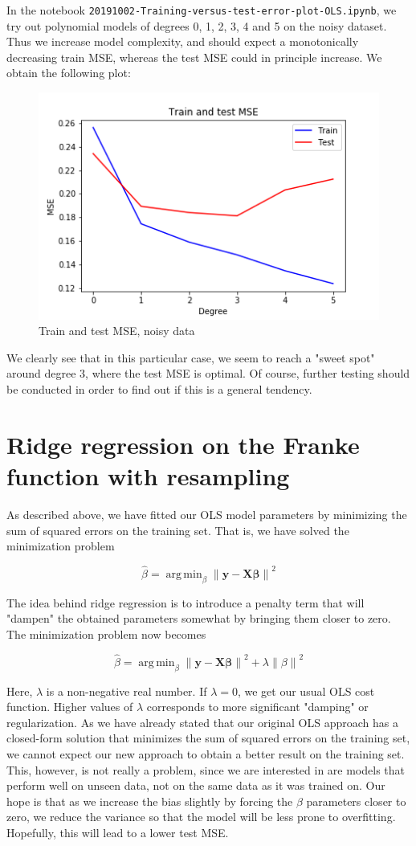 \documentclass{article}
\DeclareMathOperator*{\argminA}{arg\,min}
\begin{document}
In the notebook \texttt{20191002-Training-versus-test-error-plot-OLS.ipynb}, we try out polynomial models of degrees 0, 1, 2, 3, 4 and 5 on the noisy dataset. Thus we increase model complexity, and should expect a monotonically decreasing train MSE, whereas the test MSE could in principle increase. We obtain the following plot:

\begin{figure}[H]
    \includegraphics{figures/3_train_and_test_mse.png}
    \caption{Train and test MSE, noisy data}
    \label{}
\end{figure}

We clearly see that in this particular case, we seem to reach a "sweet spot" around degree 3, where the test MSE is optimal. Of course, further testing should be conducted in order to find out if this is a general tendency.

\section{Ridge regression on the Franke function with resampling}
As described above, we have fitted our OLS model parameters by minimizing the sum of squared errors on the training set. That is, we have solved the minimization problem

$$
\hat{\beta} = \argminA_{\beta} \left\|\mathbf{y - X\beta}\right\|^2
$$

The idea behind ridge regression is to introduce a penalty term that will "dampen" the obtained parameters somewhat by bringing them closer to zero. The minimization problem now becomes

$$
\hat{\beta} = \argminA_{\beta} \left\|\mathbf{y - X\beta}\right\|^2 + \lambda\left\|\beta\right\|^2
$$

Here, $\lambda$ is a non-negative real number. If $\lambda=0$, we get our usual OLS cost function. Higher values of $\lambda$ corresponds to more significant "damping" or regularization. As we have already stated that our original OLS approach has a closed-form solution that minimizes the sum of squared errors on the training set, we cannot expect our new approach to obtain a better result on the training set. This, however, is not really a problem, since we are interested in are models that perform well on unseen data, not on the same data as it was trained on. Our hope is that as we increase the bias slightly by forcing the $\beta$ parameters closer to zero, we reduce the variance so that the model will be less prone to overfitting. Hopefully, this will lead to a lower test MSE.
\end{document}

